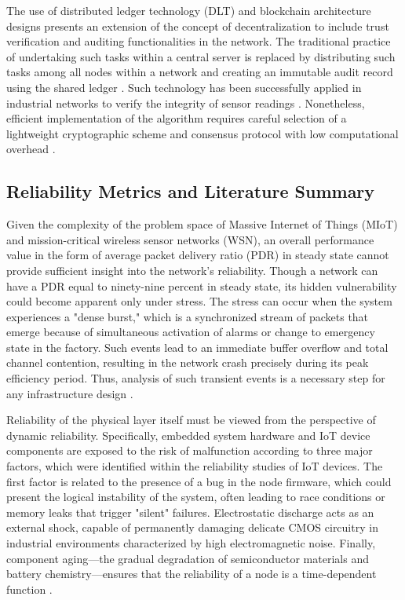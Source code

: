 \documentclass[a4paper,fleqn]{cas-dc}
\numberwithin{equation}{section}
\begin{document}
The use of distributed ledger technology (DLT) and blockchain architecture designs presents an extension of the concept of decentralization to include trust verification and auditing functionalities in the network. The traditional practice of undertaking such tasks within a central server is replaced by distributing such tasks among all nodes within a network and creating an immutable audit record using the shared ledger \cite{Savadatti_2025_DLT_Survey}. Such technology has been successfully applied in industrial networks to verify the integrity of sensor readings \cite{Rashid_2025_ZoneOfTrust}. Nonetheless, efficient implementation of the algorithm requires careful selection of a lightweight cryptographic scheme and consensus protocol with low computational overhead \cite{Wu_2025_LCAG, Hao_2024_DoubleBlockchain}.

\subsection{Reliability Metrics and Literature Summary}

Given the complexity of the problem space of Massive Internet of Things (MIoT) and mission-critical wireless sensor networks (WSN), an overall performance value in the form of average packet delivery ratio (PDR) in steady state cannot provide sufficient insight into the network's reliability. Though a network can have a PDR equal to ninety-nine percent in steady state, its hidden vulnerability could become apparent only under stress. The stress can occur when the system experiences a "dense burst," which is a synchronized stream of packets that emerge because of simultaneous activation of alarms or change to emergency state in the factory. Such events lead to an immediate buffer overflow and total channel contention, resulting in the network crash precisely during its peak efficiency period. Thus, analysis of such transient events is a necessary step for any infrastructure design \cite{b6}.

Reliability of the physical layer itself must be viewed from the perspective of dynamic reliability. Specifically, embedded system hardware and IoT device components are exposed to the risk of malfunction according to three major factors, which were identified within the reliability studies of IoT devices. The first factor is related to the presence of a bug in the node firmware, which could present the logical instability of the system, often leading to race conditions or memory leaks that trigger "silent" failures. Electrostatic discharge acts as an external shock, capable of permanently damaging delicate CMOS circuitry in industrial environments characterized by high electromagnetic noise. Finally, component aging—the gradual degradation of semiconductor materials and battery chemistry—ensures that the reliability of a node is a time-dependent function \cite{b1}.
\end{document}
